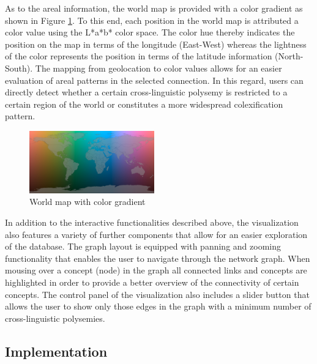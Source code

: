 As to the areal information, the world map is provided with a color gradient as shown in Figure \ref{World map}. To this end, each position in the world map is attributed a color value using the L*a*b* color space. The color hue thereby indicates the position on the map in terms of the longitude (East-West) whereas the lightness of the color represents the position in terms of the latitude information (North-South). The mapping from geolocation to color values allows for an easier evaluation of areal patterns in the selected connection. In this regard, users can directly detect whether a certain cross-linguistic polysemy is restricted to a certain region of the world or constitutes a more widespread colexification pattern.

\begin{figure}[htbp]
\begin{center}
\includegraphics[width=0.48\textwidth]{img/ColorScaleWorld.png}
\caption{World map with color gradient}
\label{World map}
\end{center}
\end{figure}



In addition to the interactive functionalities described above, the visualization also features a variety of further components that allow for an easier exploration of the database. The graph layout is equipped with panning and zooming functionality that enables the user to navigate through the network graph. When mousing over a concept (node) in the graph all connected links and concepts are highlighted
in order to provide a better overview of the connectivity of certain concepts. The control panel of the visualization also includes a slider button that allows the user to show only those edges in the graph with a minimum number of cross-linguistic polysemies. 




\subsection{Implementation}

